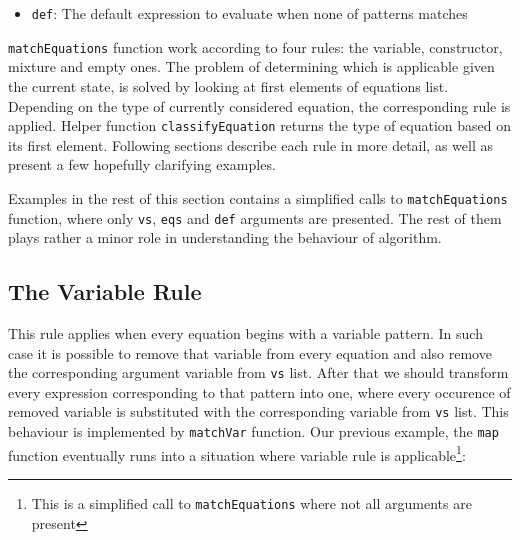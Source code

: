 \documentclass[12pt,a4paper]{report}
\begin{document}
\begin{itemize}
\hspace*{-1.5in}
\begin{lstlisting}[style=haskell]
ECaseConstr ((EConstr 3 2 (ENum 1)) (EConstr 2 0))
            [(PConstr 2 0 [], ENum 0),
             (PConstr 3 2 [PVar x, PVar xs], EVar x)]
\end{lstlisting}

\texttt{Pattern} type instances on the other hand represents patterns itself.
Patterns might be numbers, variables, constructors or special entities standing
for patterns chosen when none of other branches match. Below, the definition of
\texttt{Pattern} type is presented:

\hspace*{-1.5in}
\begin{lstlisting}[style=haskell]
data Pattern = PNum Int
             | PVar Name
             | PChar Int
             | PConstrName Name [Pattern]
             | PConstr Int Int [Pattern]
             | PDefault
\end{lstlisting}


  \item \texttt{def}: The default expression to evaluate when none of patterns
    matches
\end{itemize}

\texttt{matchEquations} function work according to four rules: the variable,
constructor, mixture and empty ones. The problem of determining which is
applicable given the current state, is solved by looking at first elements of
equations list. Depending on the type of currently considered equation, the
corresponding rule is applied. Helper function \texttt{classifyEquation}
returns the type of equation based on its first element. Following sections
describe each rule in more detail, as well as present a few hopefully
clarifying examples.

Examples in the rest of this section contains a simplified calls to
\texttt{matchEquations} function, where only \texttt{vs}, \texttt{eqs} and
\texttt{def} arguments are presented. The rest of them plays rather a minor
role in understanding the behaviour of algorithm.


\subsection{The Variable Rule}
This rule applies when every equation begins with a variable pattern. In such
case it is possible to remove that variable from every equation and also remove
the corresponding argument variable from \texttt{vs} list. After that we should
transform every expression corresponding to that pattern into one, where every
occurence of removed variable is substituted with the corresponding variable
from \texttt{vs} list. This behaviour is implemented by \texttt{matchVar}
function.
Our previous example, the \texttt{map} function eventually runs into a situation
where variable rule is applicable\footnote{This is a simplified call to
\texttt{matchEquations} where not all arguments are present}:
\end{document}
